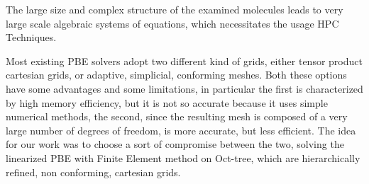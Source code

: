 \documentclass[11pt,a4paper,twocolumn]{article}
\begin{document}

The large size and complex structure of the examined molecules leads to
very large scale algebraic systems of equations, which necessitates the usage HPC Techniques. 

Most existing PBE solvers adopt two different kind of grids, either tensor product cartesian grids, or adaptive, simplicial, conforming meshes. Both these options have some advantages and some limitations, in particular the first is characterized by high memory efficiency, but it is not so accurate because it uses simple numerical methods, the second, since the resulting mesh is composed of a very large number of degrees of freedom, is more accurate, but less efficient. The idea for our work was to choose a sort of compromise between the two, solving the linearized PBE with Finite Element method on Oct-tree, which are hierarchically refined, non conforming, cartesian grids. 
\end{document}
